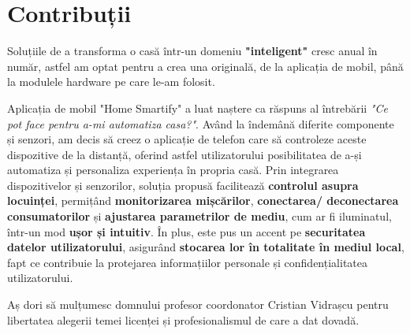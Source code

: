 \chapter*{Contribuții}
Soluțiile de a transforma o casă într-un domeniu \textbf{"inteligent"} cresc anual în număr, astfel am optat pentru a crea una originală, de la aplicația de mobil, până la modulele hardware pe care le-am folosit.

Aplicația de mobil "Home Smartify" a luat naștere ca răspuns al întrebării \emph{"Ce pot face pentru a-mi automatiza casa?"}. Având la îndemână diferite componente și senzori, am decis să creez o aplicație de telefon care să controleze aceste dispozitive de la distanță, oferind astfel utilizatorului posibilitatea de a-și automatiza și personaliza experiența în propria casă. Prin integrarea dispozitivelor și senzorilor, soluția propusă facilitează \textbf{controlul asupra locuinței}, permițând \textbf{monitorizarea mișcărilor}, \textbf{conectarea/ deconectarea consumatorilor} și \textbf{ajustarea parametrilor de mediu}, cum ar fi iluminatul, într-un mod \textbf{ușor și intuitiv}. În plus, este pus un accent pe \textbf{securitatea datelor utilizatorului}, asigurând \textbf{stocarea lor în totalitate în mediul local}, fapt ce contribuie la protejarea informațiilor personale și confidențialitatea utilizatorului.

Aș dori să mulțumesc domnului profesor coordonator Cristian Vidrașcu pentru libertatea alegerii temei licenței și profesionalismul de care a dat dovadă.
